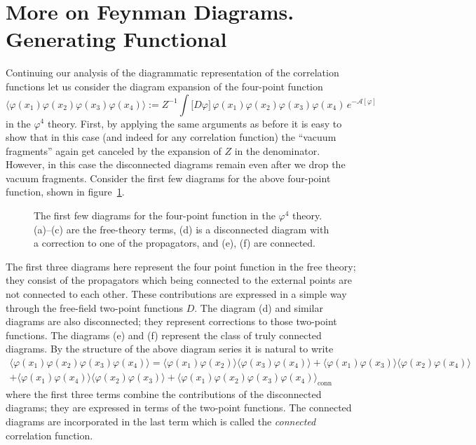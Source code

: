 \section{More on Feynman Diagrams. Generating Functional}

Continuing our analysis of the diagrammatic representation of the correlation
functions let us consider the diagram expansion of the four-point function
\[
\bigl\langle\varphi(x_1)\varphi(x_2)\varphi(x_3)\varphi(x_4)\bigr\rangle:=Z^{-1}\int\bigl[D\varphi\bigr]\,\varphi(x_1)\varphi(x_2)\varphi(x_3)\varphi(x_4)\,e^{-\mathcal A[\varphi]}
\]
in the $\varphi^4$ theory. First, by applying the same arguments as before it
is easy to show that in this case (and indeed for any correlation function)
the ``vacuum fragments'' again get canceled by the expansion of $Z$ in the
denominator. However, in this case the disconnected diagrams remain even after
we drop the vacuum fragments. Consider the first few diagrams for the above
four-point function, shown in figure~\ref{fig:fourpt}.
\begin{figure}[ht]
\centering{}
\caption{The first few diagrams for the four-point function in the $\varphi^4$
theory. (a)--(c) are the free-theory terms, (d) is a disconnected diagram
with a correction to one of the propagators, and (e), (f) are connected.}
\label{fig:fourpt}
\end{figure}

The first three diagrams here represent the four point function in the free
theory; they consist of the propagators which being connected to the external
points are not connected to each other. These contributions are expressed in a
simple way through the free-field two-point functions $D$. The diagram (d) and
similar diagrams are also disconnected; they represent corrections to those
two-point functions. The diagrams (e) and (f) represent the class of truly
connected diagrams. By the structure of the above diagram series it is natural
to write
\begin{multline*}
\bigl\langle\varphi(x_1)\varphi(x_2)\varphi(x_3)\varphi(x_4)\bigr\rangle
=\bigl\langle\varphi(x_1)\varphi(x_2)\bigr\rangle\bigl\langle\varphi(x_3)\varphi(x_4)\bigr\rangle
+\bigl\langle\varphi(x_1)\varphi(x_3)\bigr\rangle\bigl\langle\varphi(x_2)\varphi(x_4)\bigr\rangle\\
+\bigl\langle\varphi(x_1)\varphi(x_4)\bigr\rangle\bigl\langle\varphi(x_2)\varphi(x_3)\bigr\rangle
+\bigl\langle\varphi(x_1)\varphi(x_2)\varphi(x_3)\varphi(x_4)\bigr\rangle_{\text{conn}}
\end{multline*}
where the first three terms combine the contributions of the disconnected
diagrams; they are expressed in terms of the two-point functions. The connected
diagrams are incorporated in the last term which is called the
\emph{connected} correlation function.

